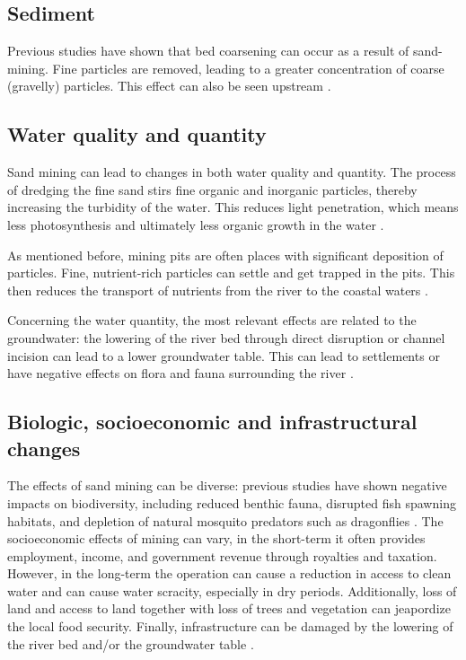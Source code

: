 \subsection{Sediment}
Previous studies have shown that bed coarsening can occur as a result of sand-mining. Fine particles are removed, leading to a greater concentration of coarse (gravelly) particles. This effect can also be seen upstream \autocite{sand-mining-boek}.

\subsection{Water quality and quantity}
Sand mining can lead to changes in both water quality and quantity. The process of dredging the fine sand stirs fine organic and inorganic particles, thereby increasing the turbidity of the water. This reduces light penetration, which means less photosynthesis and ultimately less organic growth in the water \autocite{sharipEffectsSeasonSand2014}.

As mentioned before, mining pits are often places with significant deposition of particles. Fine, nutrient-rich particles can settle and get trapped in the pits. This then reduces the transport of nutrients from the river to the coastal waters \autocite{sand-mining-boek}.

Concerning the water quantity, the most relevant effects are related to the groundwater: the lowering of the river bed through direct disruption or channel incision can lead to a lower groundwater table. This can lead to settlements or have negative effects on flora and fauna surrounding the river \autocite{rentierEnvironmentalImpactsRiver2022}.

\subsection{Biologic, socioeconomic and infrastructural changes}
The effects of sand mining can be diverse: previous studies have shown negative impacts on biodiversity, including reduced benthic fauna, disrupted fish spawning habitats, and depletion of natural mosquito predators such as dragonflies \autocite{sand-mining-boek}. The socioeconomic effects of mining can vary, in the short-term it often provides employment, income, and government revenue through royalties and taxation. However, in the long-term the operation can cause a reduction in access to clean water and can cause water scracity, especially in dry periods. Additionally, loss of land and access to land together with loss of trees and vegetation can jeapordize the local food security. Finally, infrastructure can be damaged by the lowering of the river bed and/or the groundwater table \autocite{sand-mining-boek}.



